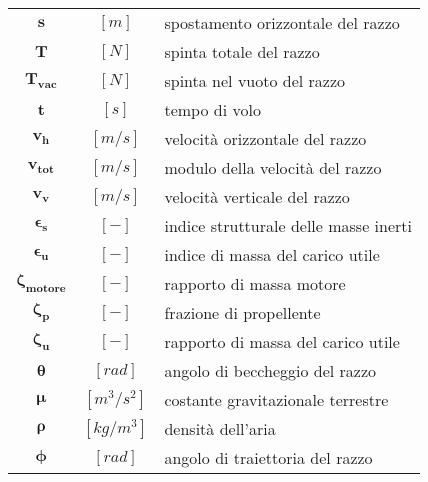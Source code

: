 \begin{multicols}{2}
{\begin{xltabular}{\linewidth}{cc>{\raggedright\arraybackslash}X}
		$\bm{s}$ & $[m]$ & spostamento orizzontale del razzo \\	
		$\bm{T}$ & $[N]$ & spinta totale del razzo \\
		$\bm{T_{vac}}$ & $[N]$ & spinta nel vuoto del razzo \\
		$\bm{t}$ & $[s]$ & tempo di volo \\
		$\bm{v_h}$ & $[m/s]$ & velocità orizzontale del razzo \\
		$\bm{v_{tot}}$ & $[m/s]$ & modulo della velocità del razzo \\
		$\bm{v_v}$ & $[m/s]$ & velocità verticale del razzo \\
		$\bm{\epsilon_s}$ & $[-]$ & indice strutturale delle masse inerti \\
        $\bm{\epsilon_u}$ & $[-]$ & indice di massa del carico utile \\
		$\bm{\zeta_{motore}}$ & $[-]$ & rapporto di massa motore \\
        $\bm{\zeta_p}$ & $[-]$ & frazione di propellente \\
		$\bm{\zeta_u}$ & $[-]$ & rapporto di massa del carico utile\\
		$\bm{\theta}$ & $[rad]$ & angolo di beccheggio del razzo \\
		$\bm{\mu}$ & $[m^3/s^2]$ & costante gravitazionale terrestre \\
		$\bm{\rho}$ & $[kg/m^3]$ & densità dell'aria \\
		$\bm{\phi}$ & $[rad]$ & angolo di traiettoria del razzo
	\end{xltabular}
	\unskip
	\unpenalty
	\unpenalty}
	\unvbox\ltmcbox


\end{multicols}
